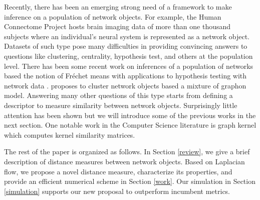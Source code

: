 \documentclass{amsart}
\begin{document}
Recently, there has been an emerging strong need of a framework to make inference on a population of network objects. For example, the Human Connectome Project \cite{van_essen_human_2012} hosts brain imaging data of more than one thousand subjects where an individual's neural system is represented as a network object. Datasets of such type pose many difficulties in providing convincing answers to questions like clustering, centrality, hypothesis test, and others at the population level.  There has been some recent work on inferences of a population of networks based the notion of Fr\'echet means \citep{frechet, linclt} with applications to hypothesis testing with network data  \cite{ginestet2017, unlabeled-18}.  \cite{NIPS2017_lin} proposes to cluster network objects based a mixture of graphon model.  Answering many other questions of this type starts from defining a descriptor to measure similarity between  network objects. Surprisingly little attention has been shown but we will introduce some of the previous works in the next section. One notable work in the Computer Science literature is graph kernel \cite{vishwanathan_graph_2010} which computes kernel similarity matrices. 


The rest of the paper is organized as follows. In Section \ref{review}, we give a brief description of distance measures between network objects. Based on Laplacian flow, we propose a novel distance measure, characterize its properties, and provide an efficient numerical scheme in Section \ref{work}. Our simulation in Section \ref{simulation} supports our new proposal to outperform incumbent metrics. 


%	


\end{document}
